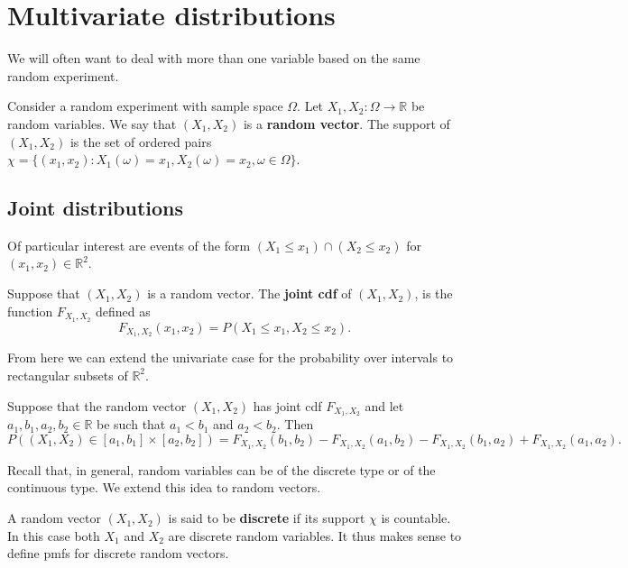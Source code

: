 \section{Multivariate distributions}

We will often want to deal with more than one variable based on the same random experiment.

\begin{definition}
	Consider a random experiment with sample space $\Omega$. Let $X_1,X_2:\Omega\to\mathbb R$ be random variables. We say that $(X_1,X_2)$ is a \textbf{random vector}. The support of $(X_1,X_2)$ is the set of ordered pairs $\chi=\{(x_1,x_2):X_1(\omega)=x_1,X_2(\omega)=x_2,\omega\in \Omega\}$.
\end{definition}

\subsection{Joint distributions}

Of particular interest are events of the form $(X_1\leq x_1)\cap(X_2\leq x_2)$ for $(x_1,x_2)\in\mathbb R^2$.

\begin{definition}
	Suppose that $(X_1,X_2)$ is a random vector. The \textbf{joint cdf} of $(X_1,X_2)$, is the function $F_{X_1,X_2}$ defined as $$F_{X_1,X_2}(x_1,x_2)=P(X_1\leq x_1,X_2\leq x_2).$$
\end{definition}

From here we can extend the univariate case for the probability over intervals to rectangular subsets of $\mathbb R^2$.

\begin{theorem}
	Suppose that the random vector $(X_1,X_2)$ has joint cdf $F_{X_1,X_2}$ and let $a_1,b_1,a_2,b_2\in\mathbb R$ be such that $a_1<b_1$ and $a_2<b_2$. Then $$P\left((X_1,X_2)\in[a_1,b_1]\times[a_2,b_2]\right)=F_{X_1,X_2}(b_1,b_2)-F_{X_1,X_2}(a_1,b_2)-F_{X_1,X_2}(b_1,a_2)+F_{X_1,X_2}(a_1,a_2).$$
\end{theorem}

Recall that, in general, random variables can be of the discrete type or of the continuous type. We extend this idea to random vectors.

A random vector $(X_1,X_2)$ is said to be \textbf{discrete} if its support $\chi$ is countable. In this case both $X_1$ and $X_2$ are discrete random variables. It thus makes sense to define pmfs for discrete random vectors.

